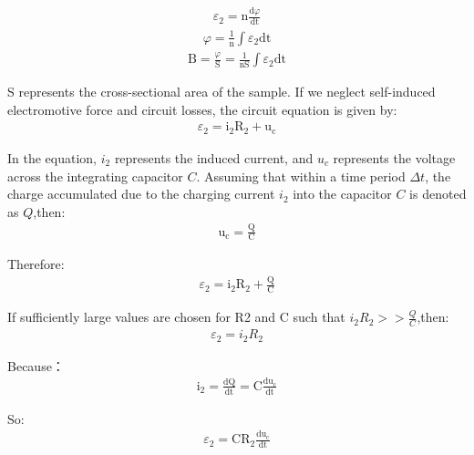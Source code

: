 \documentclass[UTF8]{article}
\begin{document}
    \begin{eqnarray}
    \varepsilon_{2}=\mathrm{n} \frac{\mathrm{d} \varphi}{\mathrm{dt}}
    \end{eqnarray}
    \begin{eqnarray}
    \varphi=\frac{1}{\mathrm{n}} \int \varepsilon_{2} \mathrm{dt}
    \end{eqnarray}
    \begin{eqnarray}
    \mathrm{B}=\frac{\varphi}{\mathrm{S}}=\frac{1}{\mathrm{nS}} \int \varepsilon_{2} \mathrm{dt} 
    \end{eqnarray}
    
    S represents the cross-sectional area of the sample.
    If we neglect self-induced electromotive force and circuit losses, the circuit equation is given by:
    \begin{eqnarray}
    \varepsilon_{2}=\mathrm{i}_{2} \mathrm{R}_{2}+\mathrm{u}_{\mathrm{c}} 
    \end{eqnarray}
    
    In the equation, $i_2$ represents the induced current, and $u_c$ represents the voltage across the integrating capacitor $C$. Assuming that within a time period $\Delta t$, the charge accumulated due to the charging current $i_2$ into the capacitor $C$ is denoted as $Q$,then:
    \begin{eqnarray}
    \mathrm{u}_{\mathrm{c}}=\frac{\mathrm{Q}}{\mathrm{C}}
    \end{eqnarray}
    
    Therefore:
    \begin{eqnarray}
    \varepsilon_{2}=\mathrm{i}_{2} \mathrm{R}_{2}+\frac{\mathrm{Q}}{\mathrm{C}} 
    \end{eqnarray}
    
    If sufficiently large values are chosen for R2 and C such that $i_2R_2 >> \frac{Q}{C}$,then:
    \begin{eqnarray}
    \varepsilon_{2} = i_2 R_2
    \end{eqnarray}
    
    Because：
    \begin{eqnarray}
    \mathrm{i}_{2}=\frac{\mathrm{dQ}}{\mathrm{dt}}=\mathrm{C} \frac{\mathrm{du}_{\mathrm{c}}}{\mathrm{dt}}
    \end{eqnarray}
    
    So:
    \begin{eqnarray}
    \varepsilon_{2}=\mathrm{CR}_{2} \frac{\mathrm{du}_{\mathrm{c}}}{\mathrm{dt}}
    \end{eqnarray}
    
\end{document}
